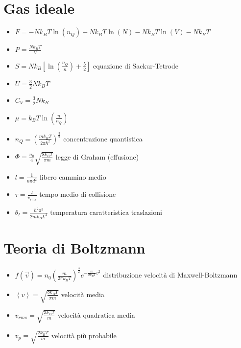 \documentclass[a4paper]{article}
\begin{document}
    \section{Gas ideale}
        \begin{itemize}
            \item $F=-Nk_BT\ln(n_Q)+Nk_BT\ln(N)-Nk_BT\ln(V)-Nk_BT$
            \item $P=\frac{Nk_BT}{V}$
            \item $S=Nk_B\left[\ln\left(\frac{n_Q}{n}\right)+\frac{5}{2}\right]$ equazione di Sackur-Tetrode
            \item $U=\frac{3}{2}Nk_BT$
            \item $C_V=\frac{3}{2}Nk_B$
            \item $\mu=k_BT\ln\left(\frac{n}{n_Q}\right)$
            \item $n_Q=\left(\frac{mk_BT}{2\pi\hbar^2}\right)^{\frac{3}{2}}$ concentrazione quantistica
            \item $\Phi=\frac{n_0}{4}\sqrt{\frac{8k_BT}{\pi m}}$ legge di Graham (effusione)
            \item $l=\frac{1}{n\pi d^2}$ libero cammino medio
            \item $\tau=\frac{l}{v_{rms}}$ tempo medio di collisione
            \item $\theta_t=\frac{\hbar^2\pi^2}{2mk_BL^2}$ temperatura caratteristica traslazioni
        \end{itemize} 

    \section{Teoria di Boltzmann}
        \begin{itemize}
            \item $f(\vec{v})=n_0\left(\frac{m}{2\pi k_BT}\right)^{\frac{3}{2}}e^{-\frac{m}{2k_BT}v^2}$ distribuzione velocità di Maxwell-Boltzmann
            \item $\left\langle v \right\rangle=\sqrt{\frac{8k_BT}{\pi m}}$ velocità media
            \item $v_{rms}=\sqrt{\frac{3k_BT}{m}}$ velocità quadratica media
            \item $v_{p}=\sqrt{\frac{2k_BT}{m}}$ velocità più probabile
        \end{itemize}
\end{document}
